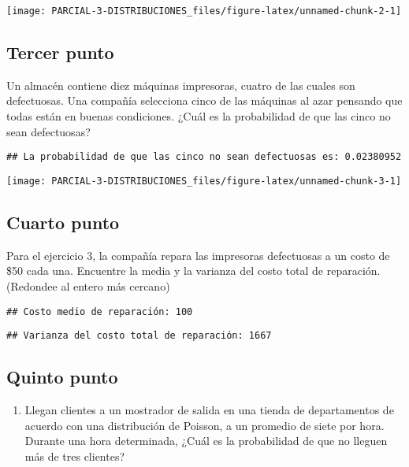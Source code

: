 \documentclass[
]{article}
\providecommand{\tightlist}{%
  \setlength{\itemsep}{0pt}\setlength{\parskip}{0pt}}
\begin{document}
\begin{center}\texttt{[image: PARCIAL-3-DISTRIBUCIONES\_files/figure-latex/unnamed-chunk-2-1]} \end{center}

\subsection{Tercer punto}\label{tercer-punto}

Un almacén contiene diez máquinas impresoras, cuatro de las cuales son
defectuosas. Una compañía selecciona cinco de las máquinas al azar
pensando que todas están en buenas condiciones. ¿Cuál es la probabilidad
de que las cinco no sean defectuosas?

\begin{verbatim}
## La probabilidad de que las cinco no sean defectuosas es: 0.02380952
\end{verbatim}

\begin{center}\texttt{[image: PARCIAL-3-DISTRIBUCIONES\_files/figure-latex/unnamed-chunk-3-1]} \end{center}

\subsection{Cuarto punto}\label{cuarto-punto}

Para el ejercicio 3, la compañía repara las impresoras defectuosas a un
costo de \$50 cada una. Encuentre la media y la varianza del costo total
de reparación. (Redondee al entero más cercano)

\begin{verbatim}
## Costo medio de reparación: 100
\end{verbatim}

\begin{verbatim}
## Varianza del costo total de reparación: 1667
\end{verbatim}

\subsection{Quinto punto}\label{quinto-punto}

\begin{enumerate}
\def\labelenumi{\arabic{enumi}.}
\setcounter{enumi}{4}
\tightlist
\item
  Llegan clientes a un mostrador de salida en una tienda de
  departamentos de acuerdo con una distribución de Poisson, a un
  promedio de siete por hora. Durante una hora determinada, ¿Cuál es la
  probabilidad de que no lleguen más de tres clientes?
\end{enumerate}
\end{document}
